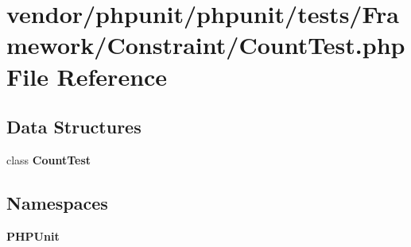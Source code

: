 \section{vendor/phpunit/phpunit/tests/\+Framework/\+Constraint/\+Count\+Test.php File Reference}
\label{_count_test_8php}
\subsection*{Data Structures}
\begin{DoxyCompactItemize}
\item 
class {\bf Count\+Test}
\end{DoxyCompactItemize}
\subsection*{Namespaces}
\begin{DoxyCompactItemize}
\item 
 {\bf P\+H\+P\+Unit}
\end{DoxyCompactItemize}
